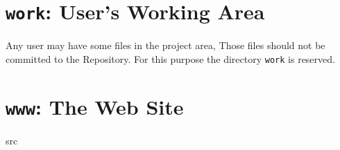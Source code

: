 \section{\texttt{work}: User's Working Area}

Any user may have some files in the project area, Those files should
not be committed to the Repository. For this purpose the directory
\texttt{work} is reserved.

\section{\texttt{www}: The Web Site}


\begin{description}
\item[src] 
\end{description}

